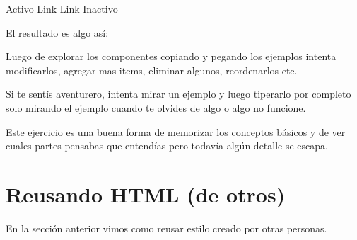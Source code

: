 \documentclass[letterpaper,10pt,spanish]{sphinxmanual}
\begin{document}
\begin{sphinxVerbatim}[commandchars=\\\{\}]
 
    Activo
    Link
    Link
    Inactivo
\end{sphinxVerbatim}

El resultado es algo así:

\begin{figure}[htbp]
\centering

\noindent{}
\end{figure}

Luego de explorar los componentes copiando y pegando los ejemplos intenta
modificarlos, agregar mas items, eliminar algunos, reordenarlos etc.

Si te sentís aventurero, intenta mirar un ejemplo y luego tiperarlo por
completo solo mirando el ejemplo cuando te olvides de algo o algo no funcione.

Este ejercicio es una buena forma de memorizar los conceptos básicos y de ver
cuales partes pensabas que entendías pero todavía algún detalle se escapa.


\chapter{Reusando HTML (de otros)}
\label{\detokenize{reusando-html-de-otros::doc}}\label{\detokenize{reusando-html-de-otros:reusando-html-de-otros}}
En la sección anterior vimos como reusar estilo creado por otras personas.
\end{document}
